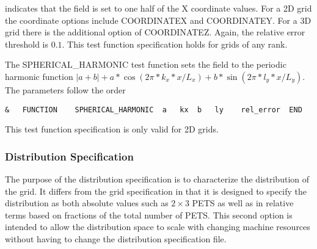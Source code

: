 indicates that the field is set to one half of the X coordinate values. For a 2D grid the coordinate options include COORDINATEX and COORDINATEY. For a 3D grid there is the additional option of COORDINATEZ. Again, the relative error threshold is $0.1$.
This test function specification holds for grids of any rank. 

The SPHERICAL\_HARMONIC test function sets the field to the periodic harmonic function 
$|a+b| + a*\cos(2\pi * k_x * x/L_x ) + b*\sin(2\pi * l_y * x/L_y )$.
The parameters follow the order

\begin{center}
\begin{verbatim}
&   FUNCTION    SPHERICAL_HARMONIC  a   kx  b   ly    rel_error  END
\end{verbatim}
\end{center}

This test function specification is only valid for 2D grids.     





\subsubsection{Distribution Specification}
\label{sec:harness_distributionsspecifier}
The purpose of the distribution specification is to characterize the distribution of the grid. It differs from the grid specification in that it is designed to specify the distribution as both absolute values such as $2 \times 3$ PETS as well as in relative terms based on fractions of the total number of PETS. This second option is intended to allow the distribution space to scale with changing machine resources without having to change the distribution specification file. 

